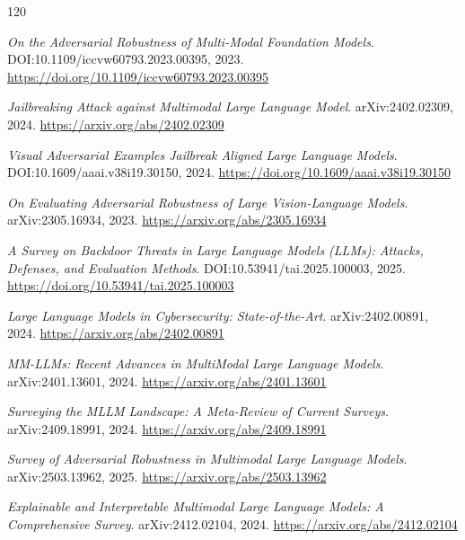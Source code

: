 \documentclass[11pt,a4paper]{article}
\begin{document}
\begin{thebibliography}{120}
\setlength{\itemsep}{2pt}

\newblock \emph{On the Adversarial Robustness of Multi-Modal Foundation Models}.
\newblock DOI:10.1109/iccvw60793.2023.00395, 2023.
\newblock \url{https://doi.org/10.1109/iccvw60793.2023.00395}

\newblock \emph{Jailbreaking Attack against Multimodal Large Language Model}.
\newblock arXiv:2402.02309, 2024.
\newblock \url{https://arxiv.org/abs/2402.02309}

\newblock \emph{Visual Adversarial Examples Jailbreak Aligned Large Language Models}.
\newblock DOI:10.1609/aaai.v38i19.30150, 2024.
\newblock \url{https://doi.org/10.1609/aaai.v38i19.30150}

\newblock \emph{On Evaluating Adversarial Robustness of Large Vision-Language Models}.
\newblock arXiv:2305.16934, 2023.
\newblock \url{https://arxiv.org/abs/2305.16934}

\newblock \emph{A Survey on Backdoor Threats in Large Language Models (LLMs): Attacks, Defenses, and Evaluation Methods}.
\newblock DOI:10.53941/tai.2025.100003, 2025.
\newblock \url{https://doi.org/10.53941/tai.2025.100003}

\newblock \emph{Large Language Models in Cybersecurity: State-of-the-Art}.
\newblock arXiv:2402.00891, 2024.
\newblock \url{https://arxiv.org/abs/2402.00891}

\newblock \emph{MM-LLMs: Recent Advances in MultiModal Large Language Models}.
\newblock arXiv:2401.13601, 2024.
\newblock \url{https://arxiv.org/abs/2401.13601}

\newblock \emph{Surveying the MLLM Landscape: A Meta-Review of Current Surveys}.
\newblock arXiv:2409.18991, 2024.
\newblock \url{https://arxiv.org/abs/2409.18991}

\newblock \emph{Survey of Adversarial Robustness in Multimodal Large Language Models}.
\newblock arXiv:2503.13962, 2025.
\newblock \url{https://arxiv.org/abs/2503.13962}

\newblock \emph{Explainable and Interpretable Multimodal Large Language Models: A Comprehensive Survey}.
\newblock arXiv:2412.02104, 2024.
\newblock \url{https://arxiv.org/abs/2412.02104}


\end{thebibliography}
\end{document}
